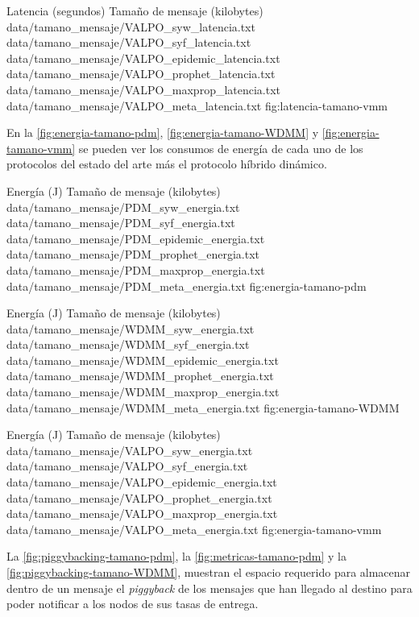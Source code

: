 {
\graficoProtocolos
{Latencia (segundos)}
{Tamaño de mensaje (kilobytes)}
{data/tamano_mensaje/VALPO_syw_latencia.txt}
{data/tamano_mensaje/VALPO_syf_latencia.txt}
{data/tamano_mensaje/VALPO_epidemic_latencia.txt}
{data/tamano_mensaje/VALPO_prophet_latencia.txt}
{data/tamano_mensaje/VALPO_maxprop_latencia.txt}
{data/tamano_mensaje/VALPO_meta_latencia.txt}
}{fig:latencia-tamano-vmm}

En la \ref{fig:energia-tamano-pdm}, \ref{fig:energia-tamano-WDMM} y 
\ref{fig:energia-tamano-vmm} se pueden ver los consumos de energía de cada uno
de los protocolos del estado del arte más el protocolo híbrido dinámico.


{
\graficoProtocolos
{Energía (J)}
{Tamaño de mensaje (kilobytes)} 
{data/tamano_mensaje/PDM_syw_energia.txt}
{data/tamano_mensaje/PDM_syf_energia.txt}
{data/tamano_mensaje/PDM_epidemic_energia.txt}
{data/tamano_mensaje/PDM_prophet_energia.txt}
{data/tamano_mensaje/PDM_maxprop_energia.txt}
{data/tamano_mensaje/PDM_meta_energia.txt}
}{fig:energia-tamano-pdm}



{
\graficoProtocolos
{Energía (J)}
{Tamaño de mensaje (kilobytes)}
{data/tamano_mensaje/WDMM_syw_energia.txt}
{data/tamano_mensaje/WDMM_syf_energia.txt}
{data/tamano_mensaje/WDMM_epidemic_energia.txt}
{data/tamano_mensaje/WDMM_prophet_energia.txt}
{data/tamano_mensaje/WDMM_maxprop_energia.txt}
{data/tamano_mensaje/WDMM_meta_energia.txt}
}{fig:energia-tamano-WDMM}



{
\graficoProtocolos
{Energía (J)}
{Tamaño de mensaje (kilobytes)}
{data/tamano_mensaje/VALPO_syw_energia.txt}
{data/tamano_mensaje/VALPO_syf_energia.txt}
{data/tamano_mensaje/VALPO_epidemic_energia.txt}
{data/tamano_mensaje/VALPO_prophet_energia.txt}
{data/tamano_mensaje/VALPO_maxprop_energia.txt}
{data/tamano_mensaje/VALPO_meta_energia.txt}
}{fig:energia-tamano-vmm}


La \ref{fig:piggybacking-tamano-pdm}, la
\ref{fig:metricas-tamano-pdm} y la
\ref{fig:piggybacking-tamano-WDMM}, muestran el espacio requerido para almacenar
dentro de un mensaje el \textit{piggyback} de los mensajes que han llegado al
destino para poder notificar a los nodos de sus tasas de entrega.



